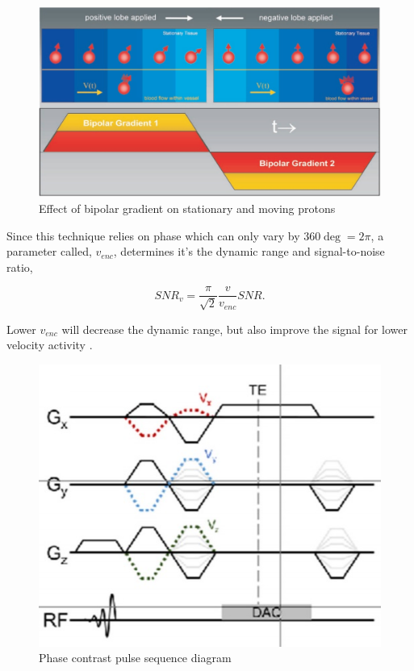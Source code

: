\begin{figure}
  \centering
  \includegraphics[scale = .5]{Figures/Lotz_2002_Cancelrad.jpg}
    \caption{Effect of bipolar gradient on stationary and moving protons\citep{Lotz2002a}}
  \label{fig:cnclphi}
\end{figure}

Since this technique relies on phase which can only vary by $360\deg = 2\pi$, a parameter called, $v_{enc}$, determines it's the dynamic range and signal-to-noise ratio,

$$SNR_{v}={\frac {\pi }{\sqrt {2}}}{\frac {v}{v_{enc}}}SNR.$$

Lower $v_{enc}$ will decrease the dynamic range, but also improve the signal for lower velocity activity \citep{Lotz2002a}.

\begin{figure}
  \centering
  \includegraphics[scale = 1]{Figures/PCMRIseq_Turski_2016.jpg}
    \caption{Phase contrast pulse sequence diagram \citep{Turski}}
  \label{fig:pcseq}
\end{figure}


